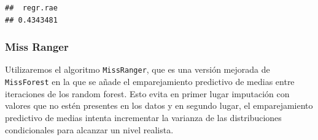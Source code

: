 \documentclass[
  11pt,
  a4paper,
]{article}
\newenvironment{Shaded}{\begin{snugshade}}{\end{snugshade}}
\newcommand{\AttributeTok}[1]{\textcolor[rgb]{0.77,0.63,0.00}{#1}}
\newcommand{\CommentTok}[1]{\textcolor[rgb]{0.56,0.35,0.01}{\textit{#1}}}
\newcommand{\DecValTok}[1]{\textcolor[rgb]{0.00,0.00,0.81}{#1}}
\newcommand{\FunctionTok}[1]{\textcolor[rgb]{0.00,0.00,0.00}{#1}}
\newcommand{\NormalTok}[1]{#1}
\newcommand{\OtherTok}[1]{\textcolor[rgb]{0.56,0.35,0.01}{#1}}
\newcommand{\SpecialCharTok}[1]{\textcolor[rgb]{0.00,0.00,0.00}{#1}}
\newcommand{\StringTok}[1]{\textcolor[rgb]{0.31,0.60,0.02}{#1}}
\begin{document}
\begin{Shaded}
\end{Shaded}

\begin{verbatim}
##  regr.rae 
## 0.4343481
\end{verbatim}

\subsubsection{Miss Ranger}

Utilizaremos el algoritmo \texttt{MissRanger}, que es una versión
mejorada de \texttt{MissForest} en la que se añade el emparejamiento
predictivo de medias entre iteraciones de los random forest. Esto evita
en primer lugar imputación con valores que no estén presentes en los
datos y en segundo lugar, el emparejamiento predictivo de medias intenta
incrementar la varianza de las distribuciones condicionales para
alcanzar un nivel realista.

\begin{Shaded}
\end{Shaded}
\end{document}
